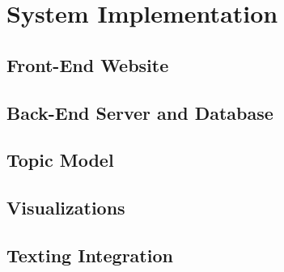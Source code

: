 \chapter{System Implementation}



\section{Front-End Website}



\section{Back-End Server and Database}



\section{Topic Model}



\section{Visualizations}



\section{Texting Integration}


